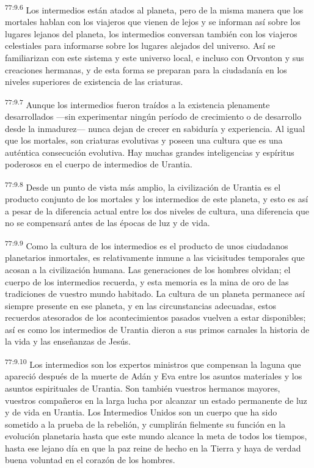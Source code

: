 \par
\textsuperscript{77:9.6} Los intermedios están atados al planeta, pero de la misma manera que los mortales hablan con los viajeros que vienen de lejos y se informan así sobre los lugares lejanos del planeta, los intermedios conversan también con los viajeros celestiales para informarse sobre los lugares alejados del universo. Así se familiarizan con este sistema y este universo local, e incluso con Orvonton y sus creaciones hermanas, y de esta forma se preparan para la ciudadanía en los niveles superiores de existencia de las criaturas.

\par
\textsuperscript{77:9.7} Aunque los intermedios fueron traídos a la existencia plenamente desarrollados ---sin experimentar ningún período de crecimiento o de desarrollo desde la inmadurez--- nunca dejan de crecer en sabiduría y experiencia. Al igual que los mortales, son criaturas evolutivas y poseen una cultura que es una auténtica consecución evolutiva. Hay muchas grandes inteligencias y espíritus poderosos en el cuerpo de intermedios de Urantia.

\par
\textsuperscript{77:9.8} Desde un punto de vista más amplio, la civilización de Urantia es el producto conjunto de los mortales y los intermedios de este planeta, y esto es así a pesar de la diferencia actual entre los dos niveles de cultura, una diferencia que no se compensará antes de las épocas de luz y de vida.

\par
\textsuperscript{77:9.9} Como la cultura de los intermedios es el producto de unos ciudadanos planetarios inmortales, es relativamente inmune a las vicisitudes temporales que acosan a la civilización humana. Las generaciones de los hombres olvidan; el cuerpo de los intermedios recuerda, y esta memoria es la mina de oro de las tradiciones de vuestro mundo habitado. La cultura de un planeta permanece así siempre presente en ese planeta, y en las circunstancias adecuadas, estos recuerdos atesorados de los acontecimientos pasados vuelven a estar disponibles; así es como los intermedios de Urantia dieron a sus primos carnales la historia de la vida y las enseñanzas de Jesús.

\par
\textsuperscript{77:9.10} Los intermedios son los expertos ministros que compensan la laguna que apareció después de la muerte de Adán y Eva entre los asuntos materiales y los asuntos espirituales de Urantia. Son también vuestros hermanos mayores, vuestros compañeros en la larga lucha por alcanzar un estado permanente de luz y de vida en Urantia. Los Intermedios Unidos son un cuerpo que ha sido sometido a la prueba de la rebelión, y cumplirán fielmente su función en la evolución planetaria hasta que este mundo alcance la meta de todos los tiempos, hasta ese lejano día en que la paz reine de hecho en la Tierra y haya de verdad buena voluntad en el corazón de los hombres.

